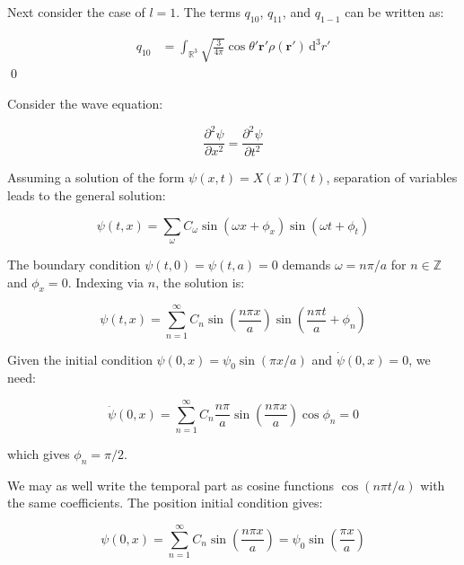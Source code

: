 \documentclass[12pt]{article}
\begin{document}
Next consider the case of $l = 1$. The terms $q_{10}$, $q_{11}$, and $q_{1-1}$ can be written as:

\begin{equation}
    \begin{split}
        q_{10} &= \int_{\mathbb{R}^{3}} \sqrt{\frac{3}{4\pi}} \cos{\theta'} \mathbf{r}' \rho(\mathbf{r}') \, \mathrm{d}^{3}r'
    \end{split}
\end{equation}
\qed



Consider the wave equation:

\begin{equation}
    \frac{\partial^{2} \psi}{\partial x^{2}} = \frac{\partial^{2} \psi}{\partial t^{2}}
\end{equation}

Assuming a solution of the form $\psi(x, t) = X(x) T(t)$, separation of variables leads to the general solution:

\begin{equation}
    \psi(t, x) = \sum_{\omega} C_{\omega} \sin{(\omega x + \phi_{x})} \sin{(\omega t + \phi_{t})}
\end{equation}

The boundary condition $\psi(t, 0) = \psi(t, a) = 0$ demands $\omega = n \pi/a$ for $n \in \mathbb{Z}$ and $\phi_{x} = 0$. Indexing via $n$, the solution is:

\begin{equation}
    \psi(t, x) = \sum_{n = 1}^{\infty} C_{n} \sin{\left( \frac{n \pi x}{a} \right)} \sin{\left( \frac{n \pi t}{a} + \phi_{n} \right)}
\end{equation}

Given the initial condition $\psi(0, x) = \psi_{0} \sin{(\pi x/a)}$ and $\dot{\psi}(0, x) = 0$, we need:

\begin{equation}
    \dot{\psi}(0, x) = \sum_{n = 1}^{\infty} C_{n} \frac{n \pi}{a} \sin{\left( \frac{n \pi x}{a} \right)} \cos{\phi_{n}} = 0
\end{equation}

which gives $\phi_{n} = \pi/2$.

We may as well write the temporal part as cosine functions $\cos{(n \pi t/a)}$ with the same coefficients. The position initial condition gives:

\begin{equation}
    \psi(0, x) = \sum_{n = 1}^{\infty} C_{n} \sin{\left( \frac{n \pi x}{a} \right)} = \psi_{0} \sin{\left( \frac{\pi x}{a} \right)}
\end{equation}
\end{document}
